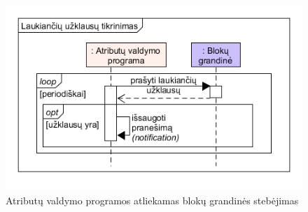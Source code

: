\begin{figure}[h]
    \centering
    \includegraphics[scale=0.6]{img/checkForPendingPermissions}
    \caption{Atributų valdymo programos atliekamas blokų grandinės stebėjimas}
    \label{fig:checkForPendingPermissions}
\end{figure}